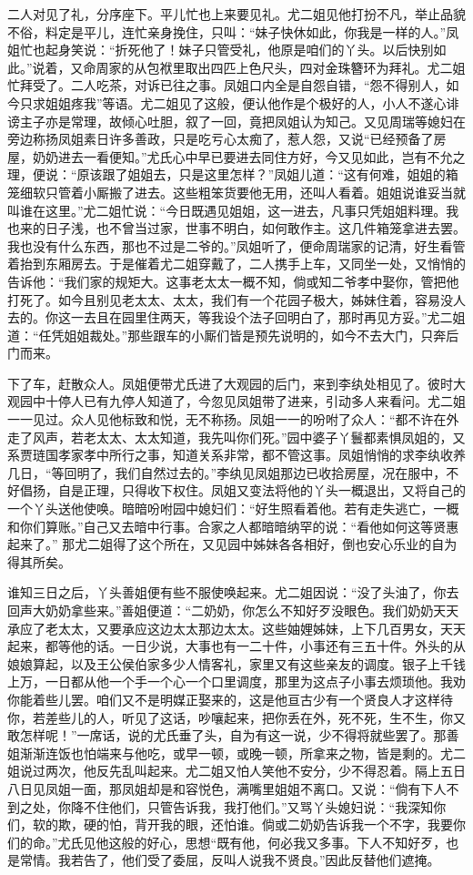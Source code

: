 二人对见了礼，分序座下。平儿忙也上来要见礼。尤二姐见他打扮不凡，举止品貌不俗，料定是平儿，连忙亲身挽住，只叫：“妹子快休如此，你我是一样的人。”凤姐忙也起身笑说：“折死他了！妹子只管受礼，他原是咱们的丫头。以后快别如此。”说着，又命周家的从包袱里取出四匹上色尺头，四对金珠簪环为拜礼。尤二姐忙拜受了。二人吃茶，对诉已往之事。凤姐口内全是自怨自错，“怨不得别人，如今只求姐姐疼我”等语。尤二姐见了这般，便认他作是个极好的人，小人不遂心诽谤主子亦是常理，故倾心吐胆，叙了一回，竟把凤姐认为知己。又见周瑞等媳妇在旁边称扬凤姐素日许多善政，只是吃亏心太痴了，惹人怨，又说“已经预备了房屋，奶奶进去一看便知。”尤氏心中早已要进去同住方好，今又见如此，岂有不允之理，便说：“原该跟了姐姐去，只是这里怎样？”凤姐儿道：“这有何难，姐姐的箱笼细软只管着小厮搬了进去。这些粗笨货要他无用，还叫人看着。姐姐说谁妥当就叫谁在这里。”尤二姐忙说：“今日既遇见姐姐，这一进去，凡事只凭姐姐料理。我也来的日子浅，也不曾当过家，世事不明白，如何敢作主。这几件箱笼拿进去罢。我也没有什么东西，那也不过是二爷的。”凤姐听了，便命周瑞家的记清，好生看管着抬到东厢房去。于是催着尤二姐穿戴了，二人携手上车，又同坐一处，又悄悄的告诉他：“我们家的规矩大。这事老太太一概不知，倘或知二爷孝中娶你，管把他打死了。如今且别见老太太、太太，我们有一个花园子极大，姊妹住着，容易没人去的。你这一去且在园里住两天，等我设个法子回明白了，那时再见方妥。”尤二姐道：“任凭姐姐裁处。”那些跟车的小厮们皆是预先说明的，如今不去大门，只奔后门而来。

下了车，赶散众人。凤姐便带尤氏进了大观园的后门，来到李纨处相见了。彼时大观园中十停人已有九停人知道了，今忽见凤姐带了进来，引动多人来看问。尤二姐一一见过。众人见他标致和悦，无不称扬。凤姐一一的吩咐了众人：“都不许在外走了风声，若老太太、太太知道，我先叫你们死。”园中婆子丫鬟都素惧凤姐的，又系贾琏国孝家孝中所行之事，知道关系非常，都不管这事。凤姐悄悄的求李纨收养几日，“等回明了，我们自然过去的。”李纨见凤姐那边已收拾房屋，况在服中，不好倡扬，自是正理，只得收下权住。凤姐又变法将他的丫头一概退出，又将自己的一个丫头送他使唤。暗暗吩咐园中媳妇们：“好生照看着他。若有走失逃亡，一概和你们算账。”自己又去暗中行事。合家之人都暗暗纳罕的说：“看他如何这等贤惠起来了。”
那尤二姐得了这个所在，又见园中姊妹各各相好，倒也安心乐业的自为得其所矣。

谁知三日之后，丫头善姐便有些不服使唤起来。尤二姐因说：“没了头油了，你去回声大奶奶拿些来。”善姐便道：“二奶奶，你怎么不知好歹没眼色。我们奶奶天天承应了老太太，又要承应这边太太那边太太。这些妯娌姊妹，上下几百男女，天天起来，都等他的话。一日少说，大事也有一二十件，小事还有三五十件。外头的从娘娘算起，以及王公侯伯家多少人情客礼，家里又有这些亲友的调度。银子上千钱上万，一日都从他一个手一个心一个口里调度，那里为这点子小事去烦琐他。我劝你能着些儿罢。咱们又不是明媒正娶来的，这是他亘古少有一个贤良人才这样待你，若差些儿的人，听见了这话，吵嚷起来，把你丢在外，死不死，生不生，你又敢怎样呢！”一席话，说的尤氏垂了头，自为有这一说，少不得将就些罢了。那善姐渐渐连饭也怕端来与他吃，或早一顿，或晚一顿，所拿来之物，皆是剩的。尤二姐说过两次，他反先乱叫起来。尤二姐又怕人笑他不安分，少不得忍着。隔上五日八日见凤姐一面，那凤姐却是和容悦色，满嘴里姐姐不离口。又说：“倘有下人不到之处，你降不住他们，只管告诉我，我打他们。”又骂丫头媳妇说：“我深知你们，软的欺，硬的怕，背开我的眼，还怕谁。倘或二奶奶告诉我一个不字，我要你们的命。”尤氏见他这般的好心，思想“既有他，何必我又多事。下人不知好歹，也是常情。我若告了，他们受了委屈，反叫人说我不贤良。”因此反替他们遮掩。

